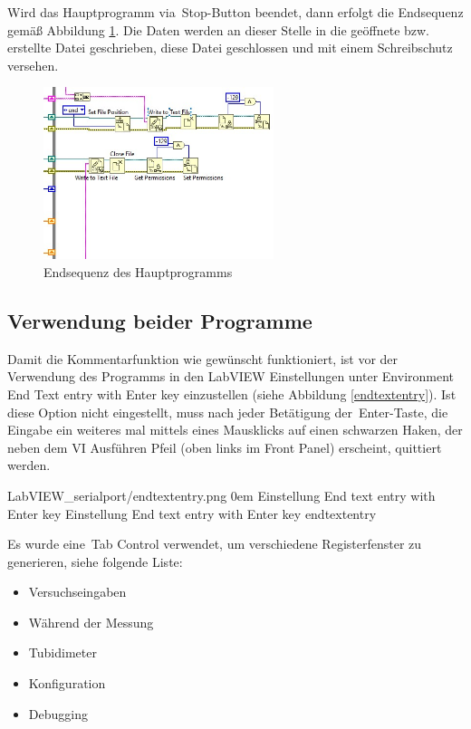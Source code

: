 Wird das Hauptprogramm via \,{\Menlo Stop}-Button beendet, dann erfolgt die Endsequenz gemäß Abbildung \ref{fig:endsequenz}. Die Daten werden an dieser Stelle in die geöffnete bzw. erstellte Datei geschrieben, diese Datei geschlossen und mit einem Schreibschutz versehen.  

\begin{figure}[h!] %
 \centering
 \includegraphics[width=0.6\textwidth]{Bilder/LabVIEW_serialport/endsequenz.jpg}
 \vspace{0em}
  \caption[Endsequenz des Hauptprogramms]
 {Endsequenz des Hauptprogramms}\label{fig:endsequenz}
 \end{figure} 
\pagebreak

\subsection{Verwendung beider Programme}
\label{sec:Haupt_VI_Nutzung}

Damit die Kommentarfunktion wie gewünscht funktioniert, ist vor der Verwendung des Programms in den LabVIEW Einstellungen unter Environment \,{\Menlo  End Text entry with Enter key} einzustellen (siehe Abbildung \ref{endtextentry}). Ist diese Option nicht eingestellt, muss nach jeder Betätigung der \,{\Menlo Enter}-Taste, die Eingabe ein weiteres mal mittels eines Mausklicks auf einen schwarzen Haken, der neben dem VI Ausführen Pfeil (oben links im Front Panel) erscheint, quittiert werden.

{LabVIEW_serialport/endtextentry.png}
{0em}
{Einstellung \glqq End text entry with Enter key\grqq{}}
{Einstellung \glqq End text entry with Enter key\grqq{}}
{endtextentry}

Es wurde eine \,{\Menlo Tab Control} verwendet, um verschiedene Registerfenster zu generieren, siehe folgende Liste:

\begin{itemize} %
\singlespacing
\item Versuchseingaben
\item Während der Messung
\item Tubidimeter
\item \textcolor{black!50}{Konfiguration}
\item \textcolor{black!50}{Debugging}
\end{itemize}

